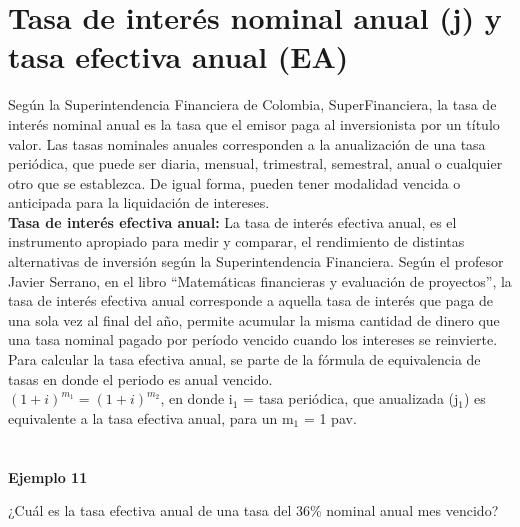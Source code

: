 \section{Tasa de interés nominal anual (j) y tasa efectiva anual (EA)}

Según la Superintendencia Financiera de Colombia, SuperFinanciera, la tasa de interés nominal anual es la tasa que el emisor paga al inversionista por un título valor. Las tasas nominales anuales corresponden a la anualización de una tasa periódica, que puede ser diaria, mensual, trimestral, semestral, anual o cualquier otro que se establezca. De igual forma, pueden tener modalidad vencida o anticipada para la liquidación de intereses.\\

\textbf{Tasa de interés efectiva anual:} La tasa de interés efectiva anual, es el instrumento apropiado para medir y comparar, el rendimiento de distintas alternativas de inversión según la Superintendencia Financiera. Según el profesor Javier Serrano, en el libro “Matemáticas financieras y evaluación de proyectos”, la tasa de interés efectiva anual corresponde a aquella tasa de interés que paga de una sola vez al final del año, permite acumular la misma cantidad de dinero que una tasa nominal pagado por período vencido cuando los intereses se reinvierte.\\

Para calcular la tasa efectiva anual, se parte de la fórmula de equivalencia de tasas en donde el periodo es anual vencido.\\ 

	$(1+i)^{m_1} = (1+i)^{m_2}$,
en donde i$_{1}$ = tasa periódica, que anualizada (j$_{1}$) es equivalente a la tasa efectiva anual, para un m$_{1}$ = 1 pav.\\ \\ \\


\textbf{Ejemplo 11}

¿Cuál es la tasa efectiva anual de una tasa del 36\% nominal anual mes vencido?\\

